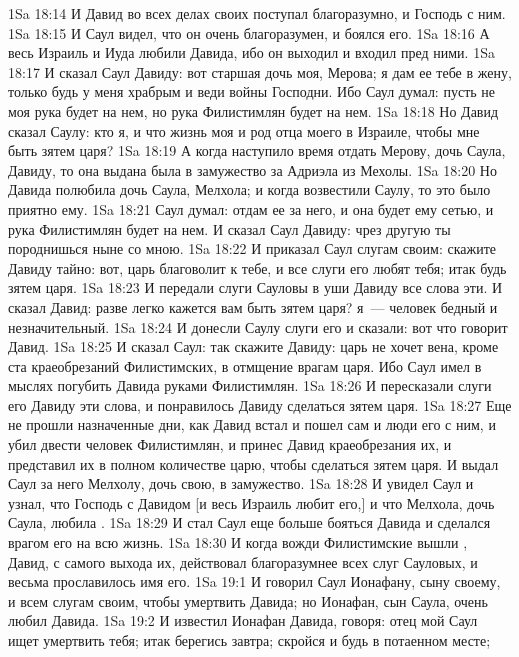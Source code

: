 \vs 1Sa 18:14 И Давид во всех делах своих поступал благоразумно, и Господь  с ним.
\vs 1Sa 18:15 И Саул видел, что он очень благоразумен, и боялся его.
\vs 1Sa 18:16 А весь Израиль и Иуда любили Давида, ибо он выходил и входил пред ними.
\vs 1Sa 18:17 И сказал Саул Давиду: вот старшая дочь моя, Мерова; я дам ее тебе в жену, только будь у меня храбрым и веди войны Господни. Ибо Саул думал: пусть не моя рука будет на нем, но рука Филистимлян будет на нем.
\vs 1Sa 18:18 Но Давид сказал Саулу: кто я, и что жизнь моя и род отца моего в Израиле, чтобы мне быть зятем царя?
\vs 1Sa 18:19 А когда наступило время отдать Мерову, дочь Саула, Давиду, то она выдана была в замужество за Адриэла из Мехолы.
\vs 1Sa 18:20 Но Давида полюбила  дочь Саула, Мелхола; и когда возвестили  Саулу, то это было приятно ему.
\vs 1Sa 18:21 Саул думал: отдам ее за него, и она будет ему сетью, и рука Филистимлян будет на нем. И сказал Саул Давиду: чрез другую ты породнишься ныне со мною.
\vs 1Sa 18:22 И приказал Саул слугам своим: скажите Давиду тайно: вот, царь благоволит к тебе, и все слуги его любят тебя; итак будь зятем царя.
\vs 1Sa 18:23 И передали слуги Сауловы в уши Давиду все слова эти. И сказал Давид: разве легко кажется вам быть зятем царя? я~--- человек бедный и незначительный.
\vs 1Sa 18:24 И донесли Саулу слуги его и сказали: вот что говорит Давид.
\vs 1Sa 18:25 И сказал Саул: так скажите Давиду: царь не хочет вена, кроме ста краеобрезаний Филистимских, в отмщение врагам царя. Ибо Саул имел в мыслях погубить Давида руками Филистимлян.
\vs 1Sa 18:26 И пересказали слуги его Давиду эти слова, и понравилось Давиду сделаться зятем царя.
\vs 1Sa 18:27 Еще не прошли назначенные дни, как Давид встал и пошел сам и люди его с ним, и убил двести человек Филистимлян, и принес Давид краеобрезания их, и представил их в полном количестве царю, чтобы сделаться зятем царя. И выдал Саул за него Мелхолу, дочь свою, в замужество.
\vs 1Sa 18:28 И увидел Саул и узнал, что Господь с Давидом [и весь Израиль любит его,] и что Мелхола, дочь Саула, любила .
\vs 1Sa 18:29 И стал Саул еще больше бояться Давида и сделался врагом его на всю жизнь.
\vs 1Sa 18:30 И когда вожди Филистимские вышли , Давид, с самого выхода их, действовал благоразумнее всех слуг Сауловых, и весьма прославилось имя его.
\vs 1Sa 19:1 И говорил Саул Ионафану, сыну своему, и всем слугам своим, чтобы умертвить Давида; но Ионафан, сын Саула, очень любил Давида.
\vs 1Sa 19:2 И известил Ионафан Давида, говоря: отец мой Саул ищет умертвить тебя; итак берегись завтра; скройся и будь в потаенном месте;
